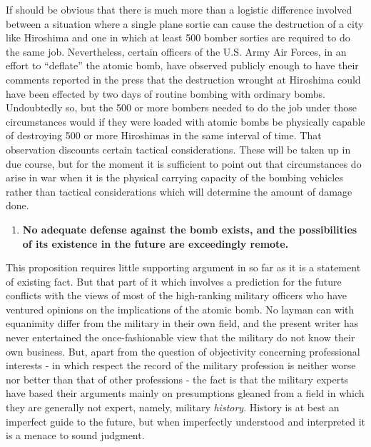 If should be obvious that there is much more than a logistic difference involved between a situation where a single plane sortie can cause the destruction of a city like Hiroshima and one in which at least 500 bomber sorties are required to do the same job. Nevertheless, certain officers of the U.S. Army Air Forces, in an effort to ``deflate'' the atomic bomb, have observed publicly enough to have their comments reported in the press that the destruction wrought at Hiroshima could have been effected by two days of routine bombing with ordinary bombs. Undoubtedly so, but the 500 or more bombers needed to do the job under those circumstances would if they were loaded with atomic bombs be physically capable of destroying 500 or more Hiroshimas in the same interval of time. That observation discounts certain tactical considerations. These will be taken up in due course, but for the moment it is sufficient to point out that circumstances do arise in war when it is the physical carrying capacity of the bombing vehicles rather than tactical considerations which will determine the amount of damage done.

\begin{enumerate}[resume*]

\item \textbf{No adequate defense against the bomb exists, and the possibilities of its existence in the future are exceedingly remote.}

\end{enumerate}

This proposition requires little supporting argument in so far as it is a statement of existing fact. But that part of it which involves a prediction for the future conflicts with the views of most of the high-ranking military officers who have ventured opinions on the implications of the atomic bomb. No layman can with equanimity differ from the military in their own field, and the present writer has never entertained the once-fashionable view that the military do not know their own business. But, apart from the question of objectivity concerning professional interests - in which respect the record of the military profession is neither worse nor better than that of other professions - the fact is that the military experts have based their arguments mainly on presumptions gleaned from a field in which they are generally not expert, namely, military \emph{history}. History is at best an imperfect guide to the future, but when imperfectly understood and interpreted it is a menace to sound judgment.

